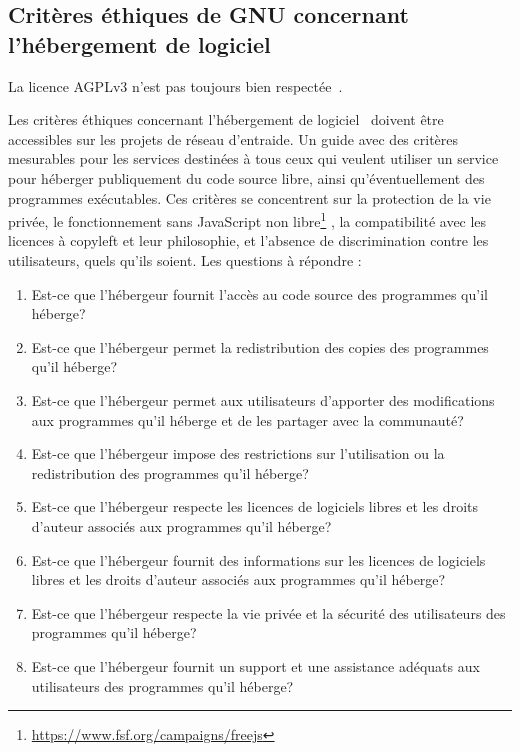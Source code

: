 \subsection{Critères éthiques de GNU concernant l'hébergement de logiciel}

La licence AGPLv3 n’est pas toujours bien respectée~\cite{violation_libre_2017}.

Les critères éthiques concernant l'hébergement de logiciel~\cite{gnu_critere_hebergement_2022} doivent être accessibles sur les projets de réseau d’entraide. Un guide avec des critères mesurables pour les services destinées à tous ceux qui veulent utiliser un service pour héberger publiquement du code source libre, ainsi qu'éventuellement des programmes exécutables. Ces critères se concentrent sur la protection de la vie privée, le fonctionnement sans JavaScript non libre\footnote{\url{https://www.fsf.org/campaigns/freejs}} , la compatibilité avec les licences à copyleft et leur philosophie, et l'absence de discrimination contre les utilisateurs, quels qu'ils soient.  Les questions à répondre : 

\begin{enumerate}
    \item Est-ce que l'hébergeur fournit l'accès au code source des programmes qu'il héberge?
    \item Est-ce que l'hébergeur permet la redistribution des copies des programmes qu'il héberge?
    \item Est-ce que l'hébergeur permet aux utilisateurs d'apporter des modifications aux programmes qu'il héberge et de les partager avec la communauté?
    \item Est-ce que l'hébergeur impose des restrictions sur l'utilisation ou la redistribution des programmes qu'il héberge?
    \item Est-ce que l'hébergeur respecte les licences de logiciels libres et les droits d'auteur associés aux programmes qu'il héberge?
    \item Est-ce que l'hébergeur fournit des informations sur les licences de logiciels libres et les droits d'auteur associés aux programmes qu'il héberge?
    \item Est-ce que l'hébergeur respecte la vie privée et la sécurité des utilisateurs des programmes qu'il héberge?
    \item Est-ce que l'hébergeur fournit un support et une assistance adéquats aux utilisateurs des programmes qu'il héberge?
\end{enumerate}

